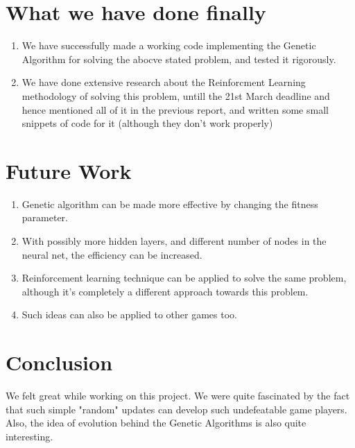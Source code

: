 \documentclass{article}
\begin{document}
\section{What we have done finally}
\begin{enumerate}
\item We have successfully made a working code implementing the Genetic Algorithm for solving the abocve stated problem, and tested it rigorously.
\item We have done extensive research about the Reinforcment Learning methodology of solving this problem, untill the 21st March deadline and hence mentioned all of it in the previous report, and written some small snippets of code for it (although they don't work properly)
\end{enumerate}

\section {Future Work}
\begin{enumerate}
    \item Genetic algorithm can be made more effective by changing the fitness parameter.
    \item With possibly more hidden layers, and different number of nodes in the neural net, the efficiency can be increased.
    \item Reinforcement learning technique can be applied to solve the same problem, although it's completely a different approach towards this problem. 
    \item Such ideas can also be applied to other games too.     
\end{enumerate}

\section{Conclusion}
We felt great while working on this project. We were quite fascinated by the fact that such simple "random" updates can develop such undefeatable game players. Also, the idea of evolution behind the Genetic Algorithms is also quite interesting.
\end{document}

